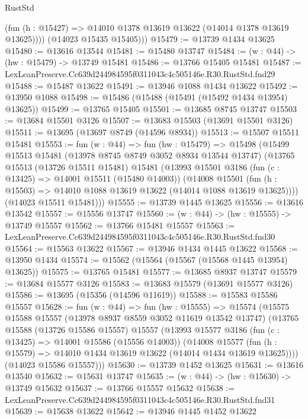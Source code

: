 \begin{lexlean}{RustStd}
\begin{coremodule}
            (fun (h : @15427) => @14010 @1378 @13619 @13622 (@14014 @1378 @13619 @13625))))
        (@14023 @15435 @15405)))
@15479 := @13739 @1434 @13625
@15480 := @13616 @13544
@15481 := @15480 @13747
@15484 := (w : @44) -> (hw : @15479) -> @13749 @15481
@15486 := @13766 @15405 @15481
@15487 := LexLeanPreserve.Cc639d244984595f0311043c4c505146e.R30.RustStd.fnd29
@15488 := @15487 @13622
@15491 := @13946 @1088 @1434 @13622
@15492 := @13950 @1088
@15498 := @15486 (@15488 (@15491 (@15492 @1434 @13954) @13625))
@15499 := @13765 @15405
@15501 := @13685 @8745 @13747
@15503 := @13684 @15501 @3126
@15507 := @13683 @15503 (@13691 @15501 @3126)
@15511 := @13695 (@13697 @8749 (@14596 @8934))
@15513 := @15507 @15511 @15481
@15553 := fun (w : @44) =>
  fun (hw : @15479) =>
  @15498
    (@15499
      @15513
      @15481
      (@13978 @8745 @8749 @3052 @8934 @13544 @13747)
      (@13765
        @15513
        (@13726 @15511 @15481)
        @15481
        (@13993
          @15501
          @3186
          (fun (c : @13425) => @14001 @15511 (@15480 @14003))
          (@14008
            @15501
            (fun (h : @15503) => @14010 @1088 @13619 @13622 (@14014 @1088 @13619 @13625))))
        (@14023 @15511 @15481)))
@15555 := @13739 @1445 @13625
@15556 := @13616 @13542
@15557 := @15556 @13747
@15560 := (w : @44) -> (hw : @15555) -> @13749 @15557
@15562 := @13766 @15481 @15557
@15563 := LexLeanPreserve.Cc639d244984595f0311043c4c505146e.R30.RustStd.fnd30
@15564 := @15563 @13622
@15567 := @13946 @1434 @1445 @13622
@15568 := @13950 @1434
@15574 := @15562 (@15564 (@15567 (@15568 @1445 @13954) @13625))
@15575 := @13765 @15481
@15577 := @13685 @8937 @13747
@15579 := @13684 @15577 @3126
@15583 := @13683 @15579 (@13691 @15577 @3126)
@15586 := @13695 (@15356 (@14596 @11619))
@15588 := @15583 @15586 @15557
@15628 := fun (w : @44) =>
  fun (hw : @15555) =>
  @15574
    (@15575
      @15588
      @15557
      (@13978 @8937 @8559 @3052 @11619 @13542 @13747)
      (@13765
        @15588
        (@13726 @15586 @15557)
        @15557
        (@13993
          @15577
          @3186
          (fun (c : @13425) => @14001 @15586 (@15556 @14003))
          (@14008
            @15577
            (fun (h : @15579) => @14010 @1434 @13619 @13622 (@14014 @1434 @13619 @13625))))
        (@14023 @15586 @15557)))
@15630 := @13739 @1452 @13625
@15631 := @13616 @13540
@15632 := @15631 @13747
@15635 := (w : @44) -> (hw : @15630) -> @13749 @15632
@15637 := @13766 @15557 @15632
@15638 := LexLeanPreserve.Cc639d244984595f0311043c4c505146e.R30.RustStd.fnd31
@15639 := @15638 @13622
@15642 := @13946 @1445 @1452 @13622

\end{coremodule}
\end{lexlean}
